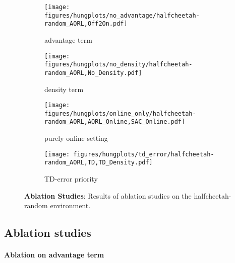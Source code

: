\begin{figure*}[ht]
    \centering
    \begin{subfigure}{.24\textwidth}
        \centering
        \texttt{[image: figures/hungplots/no\_advantage/halfcheetah-random\_AORL,Off2On.pdf]}
        \caption{advantage term}\label{fig:ablation:without_advantage:1}
    \end{subfigure}\hfil
    \begin{subfigure}{.24\textwidth}
        \centering
        \texttt{[image: figures/hungplots/no\_density/halfcheetah-random\_AORL,No\_Density.pdf]}
        \caption{density term}\label{fig:ablation:without_online:2}
    \end{subfigure}\hfil
    \begin{subfigure}{.24\textwidth}
        \centering
        \texttt{[image: figures/hungplots/online\_only/halfcheetah-random\_AORL,AORL\_Online,SAC\_Online.pdf]}
        \caption{purely online setting}\label{fig:ablation:pure_online}
    \end{subfigure}\hfil
    \begin{subfigure}{.24\textwidth}
        \centering
        \texttt{[image: figures/hungplots/td\_error/halfcheetah-random\_AORL,TD,TD\_Density.pdf]}
        \caption{TD-error priority}\label{fig:ablation:tderror:3}
    \end{subfigure}\hfil
    \caption{ \textbf{Ablation Studies}: Results of ablation studies on the halfcheetah-random environment.}
  \label{fig:ablation:without_advantage}
\end{figure*}


\subsection{Ablation studies}
\paragraph{Ablation on advantage term}




